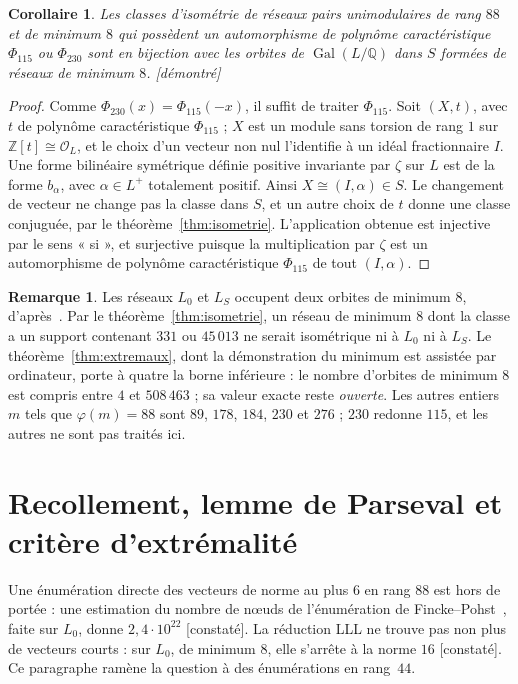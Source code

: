 \documentclass[11pt,a4paper]{amsart}
\theoremstyle{plain}
\newtheorem{corollaire}[theoreme]{Corollaire}
\theoremstyle{definition}
\newtheorem{remarque}[theoreme]{Remarque}
\numberwithin{equation}{section}
\newcommand{\Q}{\mathbb{Q}}
\newcommand{\Z}{\mathbb{Z}}
\newcommand{\OO}{\mathcal{O}}
\DeclareMathOperator{\Gal}{Gal}
\newcommand{\Lz}{L_{0}}
\newcommand{\LS}{L_{S}}
\newcommand{\st}[1]{\textup{\textsf{\small[#1]}}}
\newcommand{\DEM}{\st{démontré}}
\newcommand{\CONS}{\st{constaté}}
\begin{document}
\begin{corollaire}\label{cor:bijection}
Les classes d'isométrie de réseaux pairs unimodulaires de rang $88$ et de minimum $8$ qui possèdent un automorphisme de polynôme caractéristique $\Phi_{115}$ ou $\Phi_{230}$ sont en bijection avec les orbites de $\Gal(L/\Q)$ dans $S$ formées de réseaux de minimum $8$. \DEM
\end{corollaire}

\begin{proof}
Comme $\Phi_{230}(x)=\Phi_{115}(-x)$, il suffit de traiter $\Phi_{115}$. Soit $(X,t)$, avec $t$ de polynôme caractéristique $\Phi_{115}$ ; $X$ est un module sans torsion de rang $1$ sur $\Z[t]\cong\OO_L$, et le choix d'un vecteur non nul l'identifie à un idéal fractionnaire $I$. Une forme bilinéaire symétrique définie positive invariante par $\zeta$ sur $L$ est de la forme $b_\alpha$, avec $\alpha\in L^+$ totalement positif. Ainsi $X\cong(I,\alpha)\in S$. Le changement de vecteur ne change pas la classe dans $S$, et un autre choix de $t$ donne une classe conjuguée, par le théorème~\ref{thm:isometrie}. L'application obtenue est injective par le sens « si », et surjective puisque la multiplication par $\zeta$ est un automorphisme de polynôme caractéristique $\Phi_{115}$ de tout $(I,\alpha)$.
\end{proof}

\begin{remarque}\label{rem:autresorbites}
Les réseaux $\Lz$ et $\LS$ occupent deux orbites de minimum $8$, d'après~\cite{Sak26}. Par le théorème~\ref{thm:isometrie}, un réseau de minimum $8$ dont la classe a un support contenant $331$ ou $45\,013$ ne serait isométrique ni à $\Lz$ ni à $\LS$. Le théorème~\ref{thm:extremaux}, dont la démonstration du minimum est assistée par ordinateur, porte à quatre la borne inférieure : le nombre d'orbites de minimum $8$ est compris entre $4$ et $508\,463$ ; sa valeur exacte reste \emph{ouverte}. Les autres entiers $m$ tels que $\varphi(m)=88$ sont $89$, $178$, $184$, $230$ et $276$ ; $230$ redonne $115$, et les autres ne sont pas traités ici.
\end{remarque}

\section{Recollement, lemme de Parseval et critère d'extrémalité}\label{sec:recollement}

Une énumération directe des vecteurs de norme au plus $6$ en rang $88$ est hors de portée : une estimation du nombre de nœuds de l'énumération de Fincke--Pohst~\cite{FP85}, faite sur $\Lz$, donne $2{,}4\cdot10^{22}$ \CONS. La réduction LLL ne trouve pas non plus de vecteurs courts : sur $\Lz$, de minimum $8$, elle s'arrête à la norme $16$ \CONS. Ce paragraphe ramène la question à des énumérations en rang~$44$.
\end{document}

